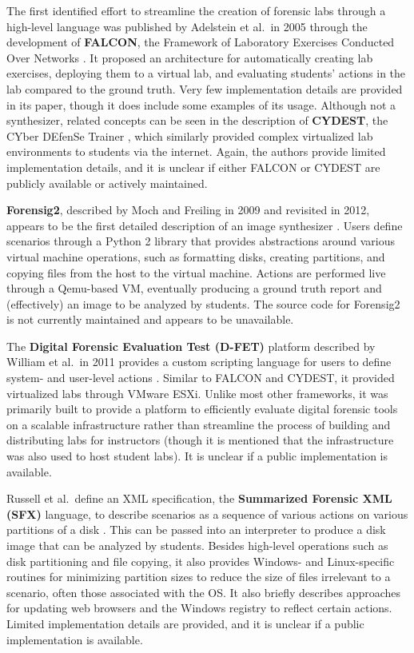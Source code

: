The first identified effort to streamline the creation of forensic labs
through a high-level language was published by Adelstein et al.~in 2005
through the development of \textbf{FALCON}, the Framework of Laboratory
Exercises Conducted Over Networks
\cite{adelsteinAutomaticallyCreatingRealistic2005}. It proposed an
architecture for automatically creating lab exercises, deploying them to
a virtual lab, and evaluating students' actions in the lab compared to
the ground truth. Very few implementation details are provided in its
paper, though it does include some examples of its usage. Although not a
synthesizer, related concepts can be seen in the description of
\textbf{CYDEST}, the CYber DEfenSe Trainer
\cite{bruecknerAutomatedComputerForensics2008}, which similarly
provided complex virtualized lab environments to students via the
internet. Again, the authors provide limited implementation details, and
it is unclear if either FALCON or CYDEST are publicly available or
actively maintained.

\textbf{Forensig2}, described by Moch and Freiling in 2009 and revisited
in 2012, appears to be the first detailed description of an image
synthesizer
\cite{mochForensicImageGenerator2009,mochEvaluatingForensicImage2012}.
Users define scenarios through a Python 2 library that provides
abstractions around various virtual machine operations, such as
formatting disks, creating partitions, and copying files from the host
to the virtual machine. Actions are performed live through a Qemu-based
VM, eventually producing a ground truth report and (effectively) an
image to be analyzed by students. The source code for Forensig2 is not
currently maintained and appears to be unavailable.

The \textbf{Digital Forensic Evaluation Test (D-FET)} platform described
by William et al.~in 2011 provides a custom scripting language for users
to define system- and user-level actions
\cite{williamCloudbasedDigitalForensics2011}. Similar to FALCON and
CYDEST, it provided virtualized labs through VMware ESXi. Unlike most
other frameworks, it was primarily built to provide a platform to
efficiently evaluate digital forensic tools on a scalable infrastructure
rather than streamline the process of building and distributing labs for
instructors (though it is mentioned that the infrastructure was also
used to host student labs). It is unclear if a public implementation is
available.

Russell et al.~define an XML specification, the \textbf{Summarized
Forensic XML (SFX)} language, to describe scenarios as a sequence of
various actions on various partitions of a disk
\cite{russellForensicImageDescription2012}. This can be passed into
an interpreter to produce a disk image that can be analyzed by students.
Besides high-level operations such as disk partitioning and file
copying, it also provides Windows- and Linux-specific routines for
minimizing partition sizes to reduce the size of files irrelevant to a
scenario, often those associated with the OS. It also briefly describes
approaches for updating web browsers and the Windows registry to reflect
certain actions. Limited implementation details are provided, and it is
unclear if a public implementation is available.

